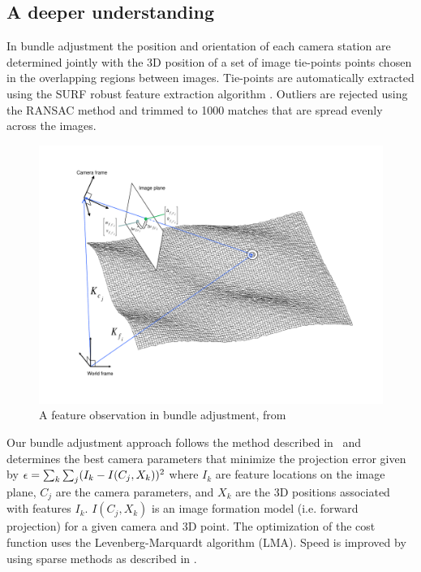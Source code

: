 \subsection{A deeper understanding}

In bundle adjustment the position and orientation of each camera station are
determined jointly with the 3D position of a set of image tie-points
points chosen in the overlapping regions between images.
Tie-points are automatically extracted using the SURF robust feature
extraction algorithm \citep{surf08}.  Outliers are rejected using
the RANSAC method and trimmed to 1000 matches that are spread evenly
across the images.

\begin{figure}[b!]
  \begin{center}
  \includegraphics[trim=20mm 20mm 20mm 15mm,clip,width=6in]{images/ba_feature_observation.pdf}
  \end{center}
  \caption{ A feature observation in bundle adjustment, from \citet{moore09} }
  \label{fig:ba_feature}
\end{figure}

Our bundle adjustment approach follows the method described
in~\cite{triggs00} and determines the best camera
parameters that minimize the projection error given by ${\bf \epsilon}
= \sum_k\sum_j(I_k-I(C_j, X_k))^2$ where $I_k$ are feature locations
on the image plane, $C_j$ are the camera parameters, and $X_k$ are the
3D positions associated with features $I_k$. $I(C_j, X_k)$ is an image
formation model (i.e. forward projection) for a given camera and 3D
point.  The optimization of the cost function uses the
Levenberg-Marquardt algorithm (LMA). Speed is improved by using sparse
methods as described in \citet{hartley04}.

